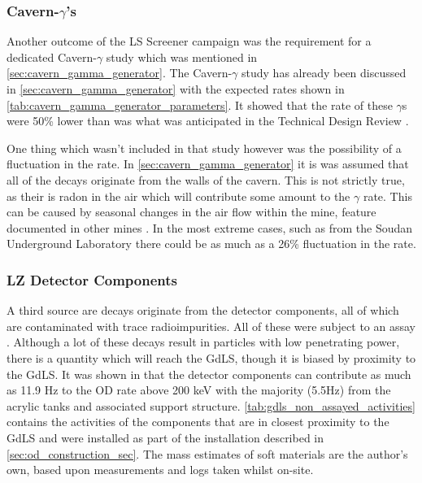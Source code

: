 


\subsubsection{Cavern-$\gamma$'s}
\par
Another outcome of the LS Screener campaign was the requirement for a dedicated Cavern-$\gamma$ study which was mentioned in \autoref{sec:cavern_gamma_generator}.
The Cavern-$\gamma$ study has already been discussed in \autoref{sec:cavern_gamma_generator} with the expected rates shown in \autoref{tab:cavern_gamma_generator_parameters}.
It showed that the rate of these $\gamma$s were 50\% lower than was what was anticipated in the Technical Design Review \cite{LZ_TechnicalDesignReview_ref}.
\par
One thing which wasn't included in that study however was the possibility of a fluctuation in the rate.
In \autoref{sec:cavern_gamma_generator} it is was assumed that all of the decays originate from the walls of the cavern.
This is not strictly true, as their is radon in the air which will contribute some amount to the $\gamma$ rate.
This can be caused by seasonal changes in the air flow within the mine, feature documented in other mines \cite{finnish_mine_radon_ref,nepal_mine_radon_ref,minos_annual_modulation_ref}.
In the most extreme cases, such as from the Soudan Underground Laboratory \cite{cavern_gammas_in_Soudan_mine_ref} there could be as much as a 26\% fluctuation in the rate.

\subsubsection{LZ Detector Components}
\par
A third source are decays originate from the detector components, all of which are contaminated with trace radioimpurities.
All of these were subject to an assay \cite{LZ_assay_ref}.
Although a lot of these decays result in particles with low penetrating power, there is a quantity which will reach the GdLS, though it is biased by proximity to the GdLS.
It was shown in \cite{scotthaselschwardt_thesis_ref} that the detector components can contribute as much as 11.9 Hz to the OD rate above 200 keV with the majority (5.5Hz) from the acrylic tanks and associated support structure.
\autoref{tab:gdls_non_assayed_activities} contains the activities of the components that are in closest proximity to the GdLS and were installed as part of the installation described in \autoref{sec:od_construction_sec}.
The mass estimates of soft materials are the author's own, based upon measurements and logs taken whilst on-site.


